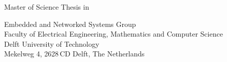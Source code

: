 
%
%
%
%

\begin{titlepage}

\begin{center}
\null\vfill
\begin{center}
\LARGE{\reportTitle}
\end{center}

\vspace{3cm}

\begin{large}
Master of Science Thesis in \reportMSC
\end{large}

\vspace{1.5cm}

\begin{normalsize}
Embedded and Networked Systems Group\\
Faculty of Electrical Engineering, Mathematics and Computer Science\\
Delft University of Technology\\
Mekelweg 4, 2628\,CD Delft, The Netherlands
\end{normalsize}

\vspace{2.0cm}

\begin{normalsize}
\reportAuthor \\
\reportUrlEmailTUD \\
\reportUrlEmailNonTUD\\
\end{normalsize}

\vspace{1.0cm}

\reportDate

\vfill
\end{center}

\end{titlepage}
